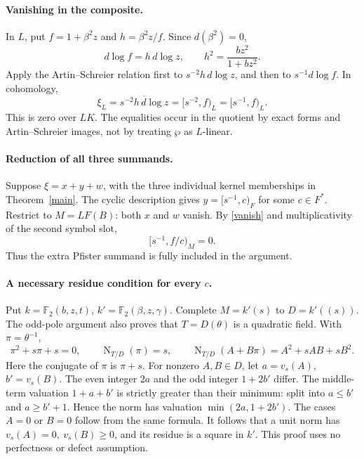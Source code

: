 \documentclass[11pt]{article}
\newcommand{\F}{\mathbb F}
\newcommand{\N}{\operatorname{N}}
\begin{document}
\paragraph{Vanishing in the composite.}
In \(L\), put \(f=1+\beta^2z\) and \(h=\beta^2z/f\).
Since \(d(\beta^2)=0\),
\[
 d\log f=h\,d\log z,\qquad h^2=\frac{bz^2}{1+bz^2}.
\]
Apply the Artin--Schreier relation first to
\(s^{-2}h\,d\log z\), and then to \(s^{-1}d\log f\). In cohomology,
\begin{equation}\label{vanish}
 \xi_L=\overline{s^{-2}h\,d\log z}
       =[s^{-2},f)_L=[s^{-1},f)_L .
\end{equation}
This is zero over \(LK\). The equalities occur in the quotient by
exact forms and Artin--Schreier images, not by treating \(\wp\)
as \(L\)-linear.

\paragraph{Reduction of all three summands.}
Suppose \(\xi=x+y+w\), with the three individual kernel memberships
in Theorem~\ref{main}. The cyclic description gives
\(y=[s^{-1},c)_F\) for some \(c\in F^*\).
Restrict to \(M=LF(B)\): both \(x\) and \(w\) vanish.
By \eqref{vanish} and multiplicativity of the second symbol slot,
\begin{equation}\label{normcondition}
 [s^{-1},f/c)_M=0.
\end{equation}
Thus the extra Pfister summand is fully included in the argument.

\paragraph{A necessary residue condition for every \(c\).}
Put \(k=\F_2(b,z,t)\), \(k'=\F_2(\beta,z,\gamma)\).
Complete \(M=k'(s)\) to \(D=k'((s))\).
The odd-pole argument also proves that \(T=D(\theta)\) is a quadratic
field. With \(\pi=\theta^{-1}\),
\[
 \pi^2+s\pi+s=0,\qquad \N_{T/D}(\pi)=s,\qquad
 \N_{T/D}(A+B\pi)=A^2+sAB+sB^2 .
\]
Here the conjugate of \(\pi\) is \(\pi+s\).
For nonzero \(A,B\in D\), let \(a=v_s(A)\), \(b'=v_s(B)\).
The even integer \(2a\) and the odd integer \(1+2b'\) differ.
The middle-term valuation \(1+a+b'\) is strictly greater than their
minimum: split into \(a\le b'\) and \(a\ge b'+1\).
Hence the norm has valuation \(\min(2a,1+2b')\).
The cases \(A=0\) or \(B=0\) follow from the same formula.
It follows that a unit norm has \(v_s(A)=0,\ v_s(B)\ge0\),
and its residue is a square in \(k'\).
This proof uses no perfectness or defect assumption.
\end{document}
